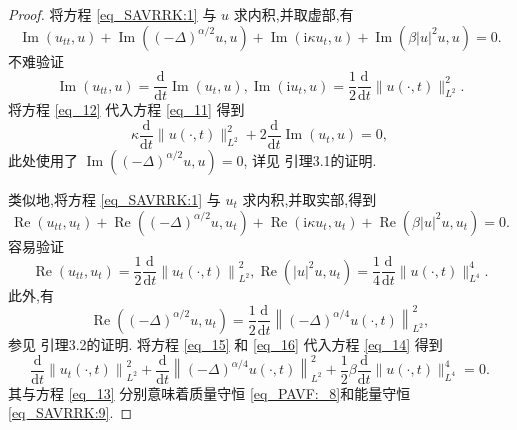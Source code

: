 \begin{proof}
	将方程 \eqref{eq_SAVRRK:1} 与 $u$ 求内积,并取虚部,有
\begin{equation}
\operatorname{Im}\left(u_{t t}, u\right)+\operatorname{Im}\left((-\Delta)^{\alpha / 2} u, u\right)+\operatorname{Im}\left(\mathrm{i} \kappa u_{t}, u\right)+\operatorname{Im}\left(\beta|u|^{2} u, u\right)=0 .
\label{eq_11}\end{equation}
不难验证
\begin{equation}
\operatorname{Im}\left(u_{t t}, u\right)=\frac{\mathrm{d}}{\mathrm{d} t} \operatorname{Im}\left(u_{t}, u\right), \operatorname{Im}\left(\mathrm{i} u_{t}, u\right)=\frac{1}{2} \frac{\mathrm{d}}{\mathrm{d} t}\|u(\cdot, t)\|_{L^{2}}^{2} .
\label{eq_12}\end{equation}
将方程 \eqref{eq_12} 代入方程 \eqref{eq_11} 得到
\begin{equation}
\kappa \frac{\mathrm{d}}{\mathrm{d} t}\|u(\cdot, t)\|_{L^{2}}^{2}+2 \frac{\mathrm{d}}{\mathrm{d} t} \operatorname{Im}\left(u_{t}, u\right)=0,
\label{eq_13}\end{equation}
此处使用了 $\operatorname{Im}\left((-\Delta)^{\alpha / 2} u, u\right)=0$,
详见 \cite{guoExistenceGlobalSmooth2008} 引理3.1的证明.

类似地,将方程 \eqref{eq_SAVRRK:1} 与 $u_{t}$ 求内积,并取实部,得到
\begin{equation}
\operatorname{Re}\left(u_{t t}, u_{t}\right)+\operatorname{Re}\left((-\Delta)^{\alpha / 2} u, u_{t}\right)+\operatorname{Re}\left(\mathrm{i} \kappa u_{t}, u_{t}\right)+\operatorname{Re}\left(\beta|u|^{2} u, u_{t}\right)=0 .
\label{eq_14}\end{equation}
容易验证
\begin{equation}
\operatorname{Re}\left(u_{t t}, u_{t}\right)=\frac{1}{2} \frac{\mathrm{d}}{\mathrm{d} t}\left\|u_{t}(\cdot, t)\right\|_{L^{2}}^{2}, \operatorname{Re}\left(|u|^{2} u, u_{t}\right)=\frac{1}{4} \frac{\mathrm{d}}{\mathrm{d} t}\|u(\cdot, t)\|_{L^{4}}^{4} .
\label{eq_15}\end{equation}
此外,有
\begin{equation}
\operatorname{Re}\left((-\Delta)^{\alpha / 2} u, u_{t}\right)=\frac{1}{2} \frac{\mathrm{d}}{\mathrm{d} t}\left\|(-\Delta)^{\alpha / 4} u(\cdot, t)\right\|_{L^{2}}^{2},
\label{eq_16}\end{equation}
参见 \cite{guoExistenceGlobalSmooth2008} 引理3.2的证明.
将方程 \eqref{eq_15} 和 \eqref{eq_16} 代入方程 \eqref{eq_14} 得到
\begin{equation}
\frac{\mathrm{d}}{\mathrm{d} t}\left\|u_{t}(\cdot, t)\right\|_{L^{2}}^{2}+\frac{\mathrm{d}}{\mathrm{d} t}\left\|(-\Delta)^{\alpha / 4} u(\cdot, t)\right\|_{L^{2}}^{2}+\frac{1}{2} \beta \frac{\mathrm{d}}{\mathrm{d} t}\|u(\cdot, t)\|_{L^{4}}^{4}=0 .
\label{eq_17}\end{equation}
其与方程 \eqref{eq_13} 分别意味着质量守恒 \eqref{eq_PAVF:_8}和能量守恒 \eqref{eq_SAVRRK:9}.
\end{proof}

